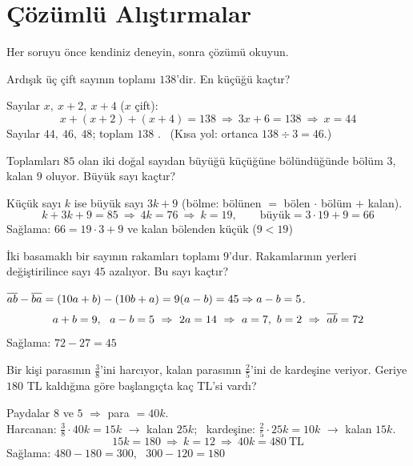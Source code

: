 \section{Çözümlü Alıştırmalar}
Her soruyu önce kendiniz deneyin, sonra çözümü okuyun.

\begin{alistirma}
Ardışık üç çift sayının toplamı \(138\)'dir. En küçüğü kaçtır?
\end{alistirma}
\begin{cozum}
Sayılar \(x,\ x+2,\ x+4\) (\(x\) çift):
\[x+(x+2)+(x+4)=138\ \Rightarrow\ 3x+6=138\ \Rightarrow\ x=44\]
Sayılar \(44,\ 46,\ 48\); toplam \(138\) \checkmark. \ (Kısa yol: ortanca \(138\div 3=46\).)
\end{cozum}

\begin{alistirma}
Toplamları \(85\) olan iki doğal sayıdan büyüğü küçüğüne bölündüğünde bölüm \(3\), kalan \(9\) oluyor. Büyük sayı kaçtır?
\end{alistirma}
\begin{cozum}
Küçük sayı \(k\) ise büyük sayı \(3k+9\) (bölme: bölünen \(=\) bölen \(\cdot\) bölüm \(+\) kalan).
\[k+3k+9=85\ \Rightarrow\ 4k=76\ \Rightarrow\ k=19,\qquad \text{büyük}=3\cdot 19+9=66\]
Sağlama: \(66=19\cdot 3+9\) ve kalan bölenden küçük (\(9<19\)) \checkmark
\end{cozum}

\begin{alistirma}
İki basamaklı bir sayının rakamları toplamı \(9\)'dur. Rakamlarının yerleri değiştirilince sayı \(45\) azalıyor. Bu sayı kaçtır?
\end{alistirma}
\begin{cozum}
\(\overline{ab}-\overline{ba}=(10a+b)-(10b+a)=9(a-b)=45\Rightarrow a-b=5\).
\[a+b=9,\ \ a-b=5\ \Rightarrow\ 2a=14\ \Rightarrow\ a=7,\ b=2\ \Rightarrow\ \ab{ab}=72\]
Sağlama: \(72-27=45\) \checkmark
\end{cozum}

\begin{alistirma}
Bir kişi parasının \(\frac{3}{8}\)'ini harcıyor, kalan parasının \(\frac{2}{5}\)'ini de kardeşine veriyor. Geriye \(180\) TL kaldığına göre başlangıçta kaç TL'si vardı?
\end{alistirma}
\begin{cozum}
Paydalar \(8\) ve \(5\) \(\Rightarrow\) para \(=40k\).\\
Harcanan: \(\frac{3}{8}\cdot 40k=15k\) \(\to\) kalan \(25k\); \ kardeşine: \(\frac{2}{5}\cdot 25k=10k\) \(\to\) kalan \(15k\).
\[15k=180\ \Rightarrow\ k=12\ \Rightarrow\ 40k=480\ \text{TL}\]
Sağlama: \(480-180=300\), \ \(300-120=180\) \checkmark
\end{cozum}

